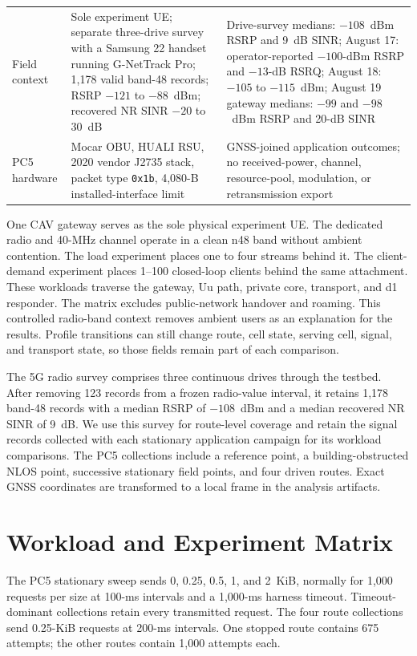 \begin{table}[t]
\begin{tabular}{@{}p{}p{}p{}@{}}
    Field context & Sole experiment UE; separate three-drive survey with a Samsung 22 handset running G-NetTrack Pro; 1,178 valid band-48 records; RSRP $-121$ to $-88$~dBm; recovered NR SINR $-20$ to 30~dB & Drive-survey medians: $-108$~dBm RSRP and 9~dB SINR; August 17: operator-reported $-100$-dBm RSRP and $-13$-dB RSRQ; August 18: $-105$ to $-115$~dBm; August 19 gateway medians: $-99$ and $-98$~dBm RSRP and 20-dB SINR \\
    PC5 hardware & Mocar OBU, HUALI RSU, 2020 vendor J2735 stack, packet type \texttt{0x1b}, 4,080-B installed-interface limit & GNSS-joined application outcomes; no received-power, channel, resource-pool, modulation, or retransmission export \\
    \bottomrule
  \end{tabular}
\end{table}

One CAV gateway serves as the sole physical experiment UE. The dedicated radio
and 40-MHz channel operate in a clean n48 band without ambient contention. The load experiment
places one to four streams behind it. The client-demand experiment places
1--100 closed-loop clients behind the same attachment. These workloads
traverse the gateway, Uu path, private core, transport, and d1 responder. The
matrix excludes public-network handover and roaming. This controlled
radio-band context removes ambient users as an explanation for the results.
Profile transitions can still change route, cell state, serving cell, signal,
and transport state, so those fields remain part of each comparison.

The 5G radio survey comprises three continuous drives through the testbed.
After removing 123 records from a frozen radio-value interval, it retains
1,178 band-48 records with a median RSRP of $-108$~dBm and a median recovered
NR SINR of 9~dB. We use this survey for route-level coverage and retain the
signal records collected with each stationary application campaign for its
workload comparisons.
The PC5 collections include a reference point, a building-obstructed NLOS
point, successive stationary field points, and four driven routes. Exact GNSS
coordinates are transformed to a local frame in the analysis artifacts.

\section{Workload and Experiment Matrix}
\label{app:matrix}

The PC5 stationary sweep sends 0, 0.25, 0.5, 1, and 2~KiB, normally for
1,000 requests per size at 100-ms intervals and a 1,000-ms harness timeout.
Timeout-dominant collections retain every transmitted request. The four route
collections send 0.25-KiB requests at 200-ms intervals. One stopped route contains
675 attempts; the other routes contain 1,000 attempts each.

